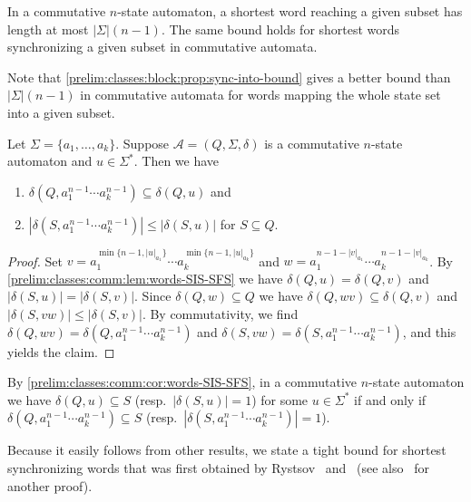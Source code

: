 \begin{corollary}
	In a commutative $n$-state automaton, a shortest word reaching
	a given subset 
	has length at most $|\Sigma|(n-1)$.	The same bound holds
	for shortest words synchronizing a given subset in commutative automata.
\end{corollary}

Note that \cref{prelim:classes:block:prop:sync-into-bound} gives 
a better bound than $|\Sigma|(n-1)$ in commutative automata 
for words mapping the whole state set into a given subset.


\begin{corollary} \label{prelim:classes:comm:cor:words-SIS-SFS}
	Let $\Sigma = \{a_1, \ldots, a_k\}$.
	Suppose $\mathcal A = (Q, \Sigma,\delta)$ is a commutative $n$-state automaton
	and $u \in \Sigma^*$.
	Then we have
	\begin{enumerate}
	\item $\delta(Q, a_1^{n-1} \cdots a_k^{n-1}) \subseteq \delta(Q, u)$ and 
		
	\item $|\delta(S, a_1^{n-1} \cdots a_k^{n-1})| \le |\delta(S, u)|$ for $S \subseteq Q$.
	\end{enumerate}
\end{corollary}
\begin{proof}
	Set $v = a_1^{\min\{n-1, |u|_{a_1}\}} \cdots a_k^{\min\{n-1, |u|_{a_k}\}}$
	and $w = a_1^{n - 1 - |v|_{a_1}} \cdots a_k^{n-1 - |v|_{a_k}}$.
	By \cref{prelim:classes:comm:lem:words-SIS-SFS} 
	we have $\delta(Q, u) = \delta(Q, v)$
	and $|\delta(S, u)| = |\delta(S, v)|$.
	Since $\delta(Q, w) \subseteq Q$
	we have $\delta(Q, wv) \subseteq \delta(Q, v)$
	and $|\delta(S, vw)| \le |\delta(S, v)|$.
	By commutativity,
	we find $\delta(Q, wv) = \delta(Q, a_1^{n-1} \cdots a_k^{n-1})$
	and $\delta(S, vw) = \delta(S, a_1^{n-1} \cdots a_k^{n-1})$,
	and this yields the claim.	
\end{proof}

By \cref{prelim:classes:comm:cor:words-SIS-SFS},
in a commutative $n$-state automaton we have $\delta(Q, u) \subseteq S$ (resp.~$|\delta(S, u)| = 1$)
for some $u \in \Sigma^*$
if and only if $\delta(Q, a_1^{n-1} \cdots a_k^{n-1}) \subseteq S$ 
(resp.~$|\delta(S, a_1^{n-1} \cdots a_k^{n-1})| = 1$).

Because it easily follows from other results,
we state a tight bound for shortest synchronizing words 
that was first obtained by Rystsov~\cite[Thm.~3.5]{Rys96} and~\cite[Thm.~3.2]{Rystsov97} 
(see also~\cite[Cor.~19]{FernauHoffmann19} for another proof).

